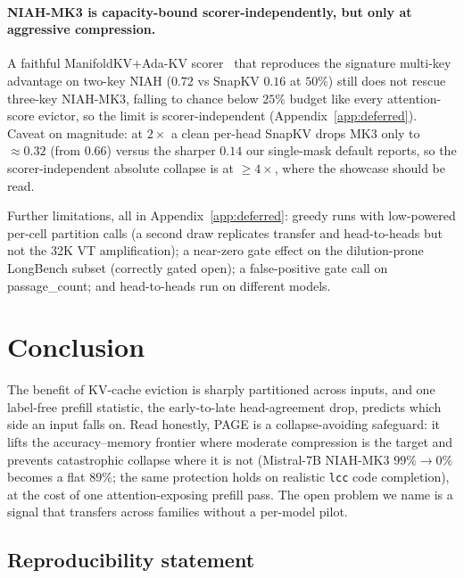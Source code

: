 \documentclass{article}
\newcommand{\method}{PAGE\xspace}
\begin{document}
\paragraph{NIAH-MK3 is capacity-bound scorer-independently, but only at
aggressive compression.} A faithful ManifoldKV+Ada-KV
scorer~\citep{arxiv260208343,arxiv240711550} that reproduces the signature
multi-key advantage on two-key NIAH ($0.72$ vs SnapKV $0.16$ at $50\%$) still
does not rescue three-key NIAH-MK3, falling to chance below $25\%$ budget like
every attention-score evictor, so the limit is scorer-independent
(Appendix~\ref{app:deferred}). Caveat on magnitude: at $2\times$ a clean per-head
SnapKV drops MK3 only to $\approx 0.32$ (from $0.66$) versus the sharper $0.14$
our single-mask default reports, so the scorer-independent absolute collapse is
at $\ge 4\times$, where the showcase should be read.

Further limitations, all in Appendix~\ref{app:deferred}: greedy runs with
low-powered per-cell partition calls (a second draw replicates transfer and
head-to-heads but not the 32K VT amplification); a near-zero gate effect on the
dilution-prone LongBench subset (correctly gated open); a false-positive gate
call on passage\_count; and head-to-heads run on different models.

\section{Conclusion}
\label{sec:conclusion}

The benefit of KV-cache eviction is sharply partitioned across inputs, and one
label-free prefill statistic, the early-to-late head-agreement drop, predicts
which side an input falls on. Read honestly, \method is a collapse-avoiding
safeguard: it lifts the accuracy--memory frontier where moderate compression is
the target and prevents catastrophic collapse where it is not (Mistral-7B
NIAH-MK3 $99\% \to 0\%$ becomes a flat $89\%$; the same protection holds on
realistic \texttt{lcc} code completion), at the cost of one attention-exposing
prefill pass. The open problem we name is a signal that transfers across families
without a per-model pilot.

\subsection*{Reproducibility statement}
\end{document}
